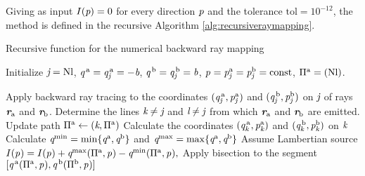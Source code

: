 Giving as input $I(\textit{p})=0$ for every direction $\textit{p}$ and the tolerance $\textrm{tol}=10^{-12}$,
the method is defined in the recursive Algorithm \ref{alg:recursiveraymapping}.
\begin{algorithm}
\caption{Recursive function for the numerical backward ray mapping}\label{alg:recursiveraymapping}
Initialize $\textit{j} = \textrm{Nl}$, $\textit{q}^{\,\textrm{a}}= \textit{q}^{\,\textrm{a}}_{\textit{j}}=-\textit{b}$, $\textit{q}^{\,\textrm{b}}= \textit{q}^{\,\textrm{b}}_{\textit{j}}=\textit{b}$, $\textit{p}_{\textrm{} \textit{}}=\textit{p}^{\textrm{a}}_{\textit{j}}=\textit{p}^{\textrm{b}}_{\textit{j}}=\textrm{const}$, $\Pi^{\textrm{a}}=({\textrm{Nl}})$.
\begin{algorithmic}[1]
\State Apply backward ray tracing to the coordinates $(\textit{q}^{\,\textrm{a}}_{\textit{j}},\textit{p}^{\textrm{a}}_{\textit{j}})$ and $(\textit{q}^{\,\textrm{b}}_{\textit{j}},\textit{p}^{\textrm{b}}_{\textit{j}})$ on $\textit{j}$ of rays $\textit{\textbf{r}}_{\textrm{a}}$ and $\textit{\textbf{r}}_{\textrm{b}}$.
\State Determine the lines $\textit{k}\neq\textit{j}$ and $\textit{l}\neq\textit{j}$ from which $\textit{\textbf{r}}_{\textrm{a}}$ and $\textit{\textbf{r}}_{\textrm{b}}$ are emitted.
\State Update path $\Pi^{\textrm{a}}\gets(\textit{k}, \Pi^{\textrm{a}})$
\State Calculate the coordinates $(\textit{q}^{\,\textrm{a}}_{\textit{k}},\textit{p}^{\textrm{a}}_{\textit{k}})$ and $(\textit{q}^{\,\textrm{b}}_{\textit{k}}, \textit{p}^{\textrm{b}}_{\textit{k}})$ on $\textit{k}$
\If {$\lineaj = \lineak$}
\State{}
\Else  \State Calculate
$\textit{q}^{\textrm{min}} = \min\{\textit{q}^{\textrm{a}}, \textit{q}^{\textrm{b}}\}$ and $\textit{q}^{\textrm{max}} = \max\{\textit{q}^{\textrm{a}}, \textit{q}^{\textrm{b}}\}$
\State Assume Lambertian source
\State $I(\textit{p}_{\textrm{} \textit{}}) = I(\textit{p}_{\textrm{} \textit{}})+\textit{q}^{\textrm{max}}(\Pi^{\textrm{a}}, \textit{p}_{\textrm{} \textit{}})
-\textit{q}^{\textrm{min}}(\Pi^{\textrm{a}}, \textit{p}_{\textrm{} \textit{}}),$ 
\EndIf
\Else 
\State Apply bisection to the segment $[\textit{q}^{\,\textrm{a}}(\Pi^\textrm{a}, \textit{p}_{\textrm{} \textit{}}), \textit{q}^{\,\textrm{b}}(\Pi^\textrm{b}, \textit{p}_{\textrm{} \textit{}})]$

\end{algorithmic}
\end{algorithm}
